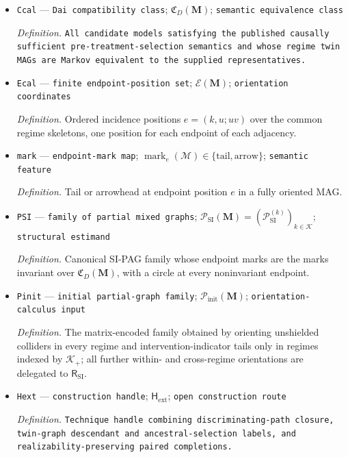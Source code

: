 \documentclass{article}
\begin{document}
\begin{itemize}
  \item \texttt{Ccal} --- \texttt{Dai compatibility class}; \(\mathfrak C_D(\mathbf M)\); \texttt{semantic equivalence class}
  \par\smallskip\noindent\emph{Definition.} \texttt{All candidate models satisfying the published causally sufficient pre-\allowbreak{}treatment-\allowbreak{}selection semantics and whose regime twin MAGs are Markov equivalent to the supplied representatives.}
  \item \texttt{Ecal} --- \texttt{finite endpoint-\allowbreak{}position set}; \(\mathcal E(\mathbf M)\); \texttt{orientation coordinates}
  \par\smallskip\noindent\emph{Definition.} Ordered incidence positions \(e=(k,u;uv)\) over the common regime skeletons, one position for each endpoint of each adjacency.
  \item \texttt{mark} --- \texttt{endpoint-\allowbreak{}mark map}; \(\operatorname{mark}_e(\mathcal M)\in\{\mathrm{tail},\mathrm{arrow}\}\); \texttt{semantic feature}
  \par\smallskip\noindent\emph{Definition.} Tail or arrowhead at endpoint position \(e\) in a fully oriented MAG.
  \item \texttt{PSI} --- \texttt{family of partial mixed graphs}; \(\mathcal P_{\mathrm{SI}}(\mathbf M)=(\mathcal P_{\mathrm{SI}}^{(k)})_{k\in\mathcal K}\); \texttt{structural estimand}
  \par\smallskip\noindent\emph{Definition.} Canonical SI-PAG family whose endpoint marks are the marks invariant over \(\mathfrak C_D(\mathbf M)\), with a circle at every noninvariant endpoint.
  \item \texttt{Pinit} --- \texttt{initial partial-\allowbreak{}graph family}; \(\mathcal P_{\mathrm{init}}(\mathbf M)\); \texttt{orientation-\allowbreak{}calculus input}
  \par\smallskip\noindent\emph{Definition.} The matrix-encoded family obtained by orienting unshielded colliders in every regime and intervention-indicator tails only in regimes indexed by \(\mathcal K_+\); all further within- and cross-regime orientations are delegated to \(\mathsf R_{\mathrm{SI}}\).
  \item \texttt{Hext} --- \texttt{construction handle}; \(\mathsf H_{\mathrm{ext}}\); \texttt{open construction route}
  \par\smallskip\noindent\emph{Definition.} \texttt{Technique handle combining discriminating-\allowbreak{}path closure,\allowbreak{} twin-\allowbreak{}graph descendant and ancestral-\allowbreak{}selection labels,\allowbreak{} and realizability-\allowbreak{}preserving paired completions.}

\end{itemize}
\end{document}
